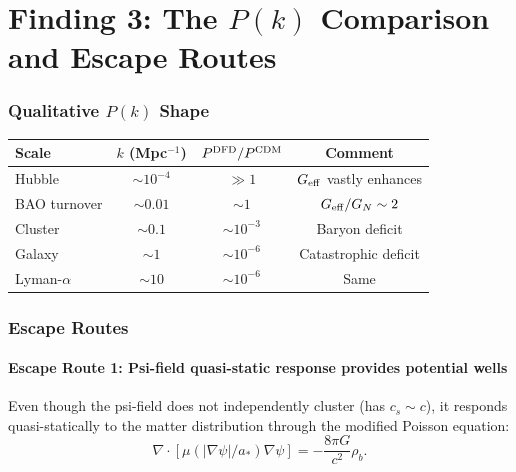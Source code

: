 \documentclass[11pt]{article}
\newcommand{\Geff}{G_{\rm eff}}
\begin{document}
\part{Finding 3: The $P(k)$ Comparison and Escape Routes}
\label{part:Pk}

\section{Qualitative $P(k)$ Shape}

\begin{center}
\begin{tabular}{lccc}
\toprule
Scale & $k$ (Mpc$^{-1}$) & $P^{\rm DFD}/P^{\rm CDM}$ & Comment \\
\midrule
Hubble & $\sim 10^{-4}$ & $\gg 1$ & $\Geff$ vastly enhances \\
BAO turnover & $\sim 0.01$ & $\sim 1$ & $\Geff/G_N \sim 2$ \\
Cluster & $\sim 0.1$ & $\sim 10^{-3}$ & Baryon deficit \\
Galaxy & $\sim 1$ & $\sim 10^{-6}$ & Catastrophic deficit \\
Lyman-$\alpha$ & $\sim 10$ & $\sim 10^{-6}$ & Same \\
\bottomrule
\end{tabular}
\end{center}

\section{Escape Routes}

\subsection{Escape Route 1: Psi-field quasi-static response provides potential wells}

Even though the psi-field does not independently cluster (has $c_s \sim c$),
it responds quasi-statically to the matter distribution through the
modified Poisson equation:
\begin{equation}
\nabla\cdot[\mu(|\nabla\psi|/a_*)\nabla\psi] = -\frac{8\pi G}{c^2}\rho_b.
\end{equation}
\end{document}
